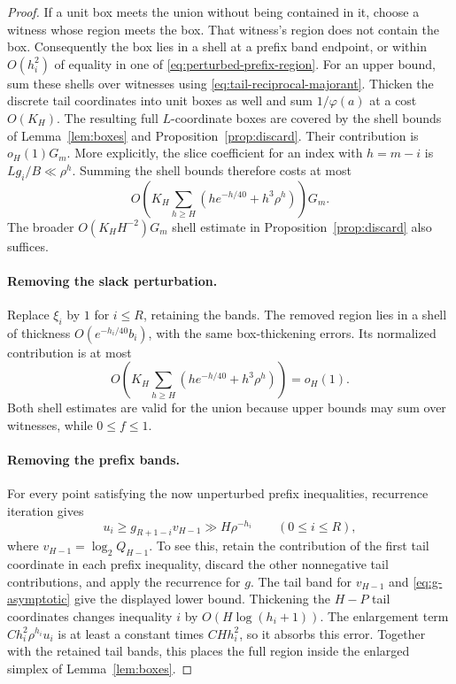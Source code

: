 \begin{proof}
If a unit box meets the union without being contained in it,
choose a witness whose region meets the box.  That witness's
region does not contain the box.  Consequently the box lies in
a shell at a prefix band endpoint, or within $O(h_i^2)$ of equality
in one of \eqref{eq:perturbed-prefix-region}.  For an upper bound,
sum these shells over witnesses using
\eqref{eq:tail-reciprocal-majorant}.  Thicken the discrete tail
coordinates into unit boxes as well and sum $1/\varphi(a)$ at a
cost $O(K_H)$.  The resulting full $L$-coordinate boxes are covered
by the shell bounds of Lemma~\ref{lem:boxes} and
Proposition~\ref{prop:discard}.  Their contribution is $o_H(1)G_m$.
More explicitly, the slice coefficient for an index with $h=m-i$
is $Lg_i/B\ll\rho^h$.  Summing the shell bounds therefore costs
at most
\[
 O\!\left(K_H\sum_{h\ge H}
       (h e^{-h/40}+h^3\rho^h)\right)G_m.
\]
The broader $O(K_HH^{-2})G_m$ shell estimate in
Proposition~\ref{prop:discard} also suffices.

\paragraph{Removing the slack perturbation.}
Replace $\xi_i$ by $1$ for $i\le R$, retaining the bands.
The removed region lies in a shell of thickness
$O(e^{-h_i/40}b_i)$, with the same box-thickening errors.
Its normalized contribution is at most
\[
 O\!\left(K_H\sum_{h\ge H}
       (h e^{-h/40}+h^3\rho^h)\right)=o_H(1).
\]
Both shell estimates are valid for the union because upper bounds
may sum over witnesses, while $0\le f\le1$.

\paragraph{Removing the prefix bands.}
For every point satisfying
the now unperturbed prefix inequalities, recurrence iteration gives
\begin{equation}
 u_i\ge g_{R+1-i}v_{H-1}\gg H\rho^{-h_i}
 \qquad(0\le i\le R),
 \label{eq:unbanded-prefix-lower}
\end{equation}
where $v_{H-1}=\log_2Q_{H-1}$.  To see this, retain the contribution
of the first tail coordinate in each prefix inequality, discard
the other nonnegative tail contributions, and apply the recurrence
for $g$.  The tail band for $v_{H-1}$ and
\eqref{eq:g-asymptotic} give the displayed lower bound.
Thickening the $H-P$ tail coordinates changes inequality $i$ by
$O(H\log(h_i+1))$. The enlargement term
$C h_i^2\rho^{h_i}u_i$ is at least a constant times $CHh_i^2$,
so it absorbs this error. Together with the retained tail bands,
this places the full region inside the enlarged simplex of
Lemma~\ref{lem:boxes}.


\end{proof}
